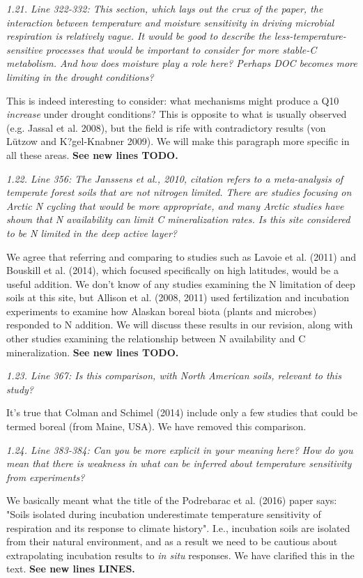 \documentclass[11pt, oneside]{article}
\begin{document}
\medskip
{\it 1.21. Line 322-332: This section, which lays out the crux of the paper, the interaction between temperature and moisture sensitivity in driving microbial respiration is relatively vague. It would be good to describe the less-temperature-sensitive processes that would be important to consider for more stable-C metabolism. And how does moisture play a role here? Perhaps DOC becomes more limiting in the drought conditions? }

This is indeed interesting to consider: what mechanisms might produce a Q10 {\it increase} under drought conditions? This is opposite to what is usually observed (e.g. Jassal et al. 2008), but the field is rife with contradictory results (von Lützow and K?gel-Knabner 2009). We will make this paragraph more specific in all these areas. {\bf See new lines TODO.}

\medskip
{\it 1.22. Line 356: The Janssens et al., 2010, citation refers to a meta-analysis of temperate forest soils that are not nitrogen limited. There are studies focusing on Arctic N cycling that would be more appropriate, and many Arctic studies have shown that N availability can limit C mineralization rates. Is this site considered to be N limited in the deep active layer? }

We agree that referring and comparing to studies such as Lavoie et al. (2011) and Bouskill et al. (2014), which focused specifically on high latitudes, would be a useful addition. We don't know of any studies examining the N limitation of deep soils at this site, but Allison et al. (2008, 2011) used fertilization and incubation experiments to examine how Alaskan boreal biota (plants and microbes) responded to N addition. We will discuss these results in our revision, along with other studies examining the relationship between N availability and C mineralization. {\bf See new lines TODO.}

\medskip
{\it 1.23. Line 367: Is this comparison, with North American soils, relevant to this study? }

It's true that Colman and Schimel (2014) include only a few studies that could be termed boreal (from Maine, USA). We have removed this comparison.

\medskip
{\it 1.24. Line 383-384: Can you be more explicit in your meaning here? How do you mean that there is weakness in what can be inferred about temperature sensitivity from experiments? }

We basically meant what the title of the Podrebarac et al. (2016) paper says: "Soils isolated during incubation underestimate temperature sensitivity of respiration and its response to climate history". I.e., incubation soils are isolated from their natural environment, and as a result we need to be cautious about extrapolating incubation results to {\it in situ} responses. We have clarified this in the text. {\bf See new lines LINES.}
\end{document}
